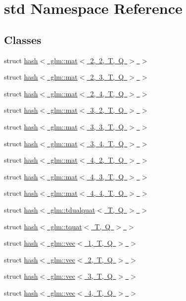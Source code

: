 \hypertarget{namespacestd}{}\section{std Namespace Reference}
\label{namespacestd}
\subsection*{Classes}
\begin{DoxyCompactItemize}
\item 
struct \mbox{\hyperlink{structstd_1_1hash_3_01glm_1_1mat_3_012_00_012_00_01_t_00_01_q_01_4_01_4}{hash$<$ glm\+::mat$<$ 2, 2, T, Q $>$ $>$}}
\item 
struct \mbox{\hyperlink{structstd_1_1hash_3_01glm_1_1mat_3_012_00_013_00_01_t_00_01_q_01_4_01_4}{hash$<$ glm\+::mat$<$ 2, 3, T, Q $>$ $>$}}
\item 
struct \mbox{\hyperlink{structstd_1_1hash_3_01glm_1_1mat_3_012_00_014_00_01_t_00_01_q_01_4_01_4}{hash$<$ glm\+::mat$<$ 2, 4, T, Q $>$ $>$}}
\item 
struct \mbox{\hyperlink{structstd_1_1hash_3_01glm_1_1mat_3_013_00_012_00_01_t_00_01_q_01_4_01_4}{hash$<$ glm\+::mat$<$ 3, 2, T, Q $>$ $>$}}
\item 
struct \mbox{\hyperlink{structstd_1_1hash_3_01glm_1_1mat_3_013_00_013_00_01_t_00_01_q_01_4_01_4}{hash$<$ glm\+::mat$<$ 3, 3, T, Q $>$ $>$}}
\item 
struct \mbox{\hyperlink{structstd_1_1hash_3_01glm_1_1mat_3_013_00_014_00_01_t_00_01_q_01_4_01_4}{hash$<$ glm\+::mat$<$ 3, 4, T, Q $>$ $>$}}
\item 
struct \mbox{\hyperlink{structstd_1_1hash_3_01glm_1_1mat_3_014_00_012_00_01_t_00_01_q_01_4_01_4}{hash$<$ glm\+::mat$<$ 4, 2, T, Q $>$ $>$}}
\item 
struct \mbox{\hyperlink{structstd_1_1hash_3_01glm_1_1mat_3_014_00_013_00_01_t_00_01_q_01_4_01_4}{hash$<$ glm\+::mat$<$ 4, 3, T, Q $>$ $>$}}
\item 
struct \mbox{\hyperlink{structstd_1_1hash_3_01glm_1_1mat_3_014_00_014_00_01_t_00_01_q_01_4_01_4}{hash$<$ glm\+::mat$<$ 4, 4, T, Q $>$ $>$}}
\item 
struct \mbox{\hyperlink{structstd_1_1hash_3_01glm_1_1tdualquat_3_01_t_00_01_q_01_4_01_4}{hash$<$ glm\+::tdualquat$<$ T, Q $>$ $>$}}
\item 
struct \mbox{\hyperlink{structstd_1_1hash_3_01glm_1_1tquat_3_01_t_00_01_q_01_4_01_4}{hash$<$ glm\+::tquat$<$ T, Q $>$ $>$}}
\item 
struct \mbox{\hyperlink{structstd_1_1hash_3_01glm_1_1vec_3_011_00_01_t_00_01_q_01_4_01_4}{hash$<$ glm\+::vec$<$ 1, T, Q $>$ $>$}}
\item 
struct \mbox{\hyperlink{structstd_1_1hash_3_01glm_1_1vec_3_012_00_01_t_00_01_q_01_4_01_4}{hash$<$ glm\+::vec$<$ 2, T, Q $>$ $>$}}
\item 
struct \mbox{\hyperlink{structstd_1_1hash_3_01glm_1_1vec_3_013_00_01_t_00_01_q_01_4_01_4}{hash$<$ glm\+::vec$<$ 3, T, Q $>$ $>$}}
\item 
struct \mbox{\hyperlink{structstd_1_1hash_3_01glm_1_1vec_3_014_00_01_t_00_01_q_01_4_01_4}{hash$<$ glm\+::vec$<$ 4, T, Q $>$ $>$}}
\end{DoxyCompactItemize}
